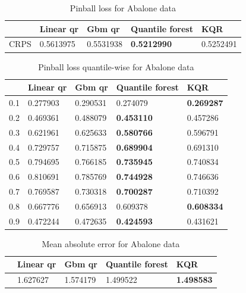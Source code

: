\begin{table}
    \caption{Pinball loss for Abalone data}
\begin{tabular}{lllll}
    \toprule
     & Linear qr & Gbm qr & Quantile forest & KQR \\
    \midrule
    CRPS & 0.5613975 & 0.5531938 & \textbf{0.5212990} & 0.5252491 \\
    \bottomrule
    \end{tabular}
\end{table}
    
\begin{table}
    \caption{Pinball loss quantile-wise for Abalone data}
    \begin{tabular}{lllll}
    \toprule
     & Linear qr & Gbm qr & Quantile forest & KQR \\
    \midrule
    0.1 & 0.277903 & 0.290531 & 0.274079 & \textbf{0.269287} \\
    0.2 & 0.469361 & 0.488079 & \textbf{0.453110} & 0.457286 \\
    0.3 & 0.621961 & 0.625633 & \textbf{0.580766} & 0.596791 \\
    0.4 & 0.729757 & 0.715875 & \textbf{0.689904} & 0.691310 \\
    0.5 & 0.794695 & 0.766185 & \textbf{0.735945} & 0.740834 \\
    0.6 & 0.810691 & 0.785769 & \textbf{0.744928} & 0.746636 \\
    0.7 & 0.769587 & 0.730318 & \textbf{0.700287} & 0.710392 \\
    0.8 & 0.667776 & 0.656913 & 0.609378 & \textbf{0.608334} \\
    0.9 & 0.472244 & 0.472635 & \textbf{0.424593} & 0.431621 \\
    \bottomrule
    \end{tabular}
\end{table}
    
\begin{table}
    \caption{Mean absolute error for Abalone data}
    \begin{tabular}{lllll}
    \toprule
     & Linear qr & Gbm qr & Quantile forest & KQR \\
    \midrule
     & 1.627627 & 1.574179 & 1.499522 & \textbf{1.498583} \\
    \bottomrule
    \end{tabular}
\end{table} 

